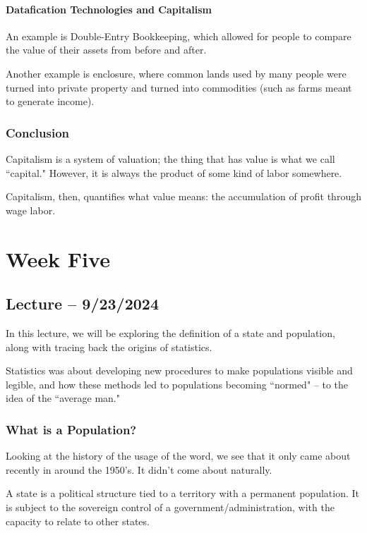 \documentclass[openany]{book}
\begin{document}
\subsubsection{Datafication Technologies and Capitalism}
An example is Double-Entry Bookkeeping, which allowed for people to compare the value of their assets from before and after.

Another example is enclosure, where common lands used by many people were turned into private property and turned into commodities (such as farms meant to generate income).

\subsection{Conclusion}
Capitalism is a system of valuation; the thing that has value is what we call ``capital." However, it is always the product of some kind of labor somewhere.

Capitalism, then, quantifies what value means: the accumulation of profit through wage labor.

\chapter{Week Five}
\section{Lecture -- 9/23/2024}
In this lecture, we will be exploring the definition of a state and population, along with tracing back the origins of statistics.

Statistics was about developing new procedures to make populations visible and legible, and how these methods led to populations becoming ``normed" -- to the idea of the ``average man."

\subsection{What is a Population?}
Looking at the history of the usage of the word, we see that it only came about recently in around the 1950's. It didn't come about naturally.

\begin{defn}[State]
	A state is a political structure tied to a territory with a permanent population. It is subject to the sovereign control of a government/administration, with the capacity to relate to other states.
\end{defn}
\end{document}
